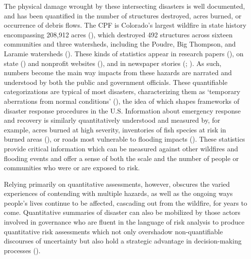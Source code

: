 \documentclass[
]{article}
\begin{document}
The physical damage wrought by these intersecting disasters is well documented, and has been quantified in the number of structures destroyed, acres burned, or occurrence of debris flows. The CPF is Colorado's largest wildfire in state history encompassing 208,912 acres (), which destroyed 492 structures across sixteen communities and three watersheds, including the Poudre, Big Thompson, and Laramie watersheds (). These kinds of statistics appear in research papers (), on state () and nonprofit websites (), and in newspaper stories (; ). As such, numbers become the main way impacts from these hazards are narrated and understood by both the public and government officials. These quantifiable categorizations are typical of most disasters, characterizing them as `temporary aberrations from normal conditions' (), the idea of which shapes frameworks of disaster response procedures in the U.S. Information about emergency response and recovery is similarly quantitatively understood and measured by, for example, acres burned at high severity, inventories of fish species at risk in burned areas (), or roads most vulnerable to flooding impacts (). These statistics provide critical information which can be measured against other wildfires and flooding events and offer a sense of both the scale and the number of people or communities who were or are exposed to risk.

Relying primarily on quantitative assessments, however, obscures the varied experiences of contending with multiple hazards, as well as the ongoing ways people's lives continue to be affected, cascading out from the wildfire, for years to come. Quantitative summaries of disaster can also be mobilized by those actors involved in governance who are fluent in the language of risk analysis to produce quantitative risk assessments which not only overshadow non-quantifiable discourses of uncertainty but also hold a strategic advantage in decision-making processes ().
\end{document}
